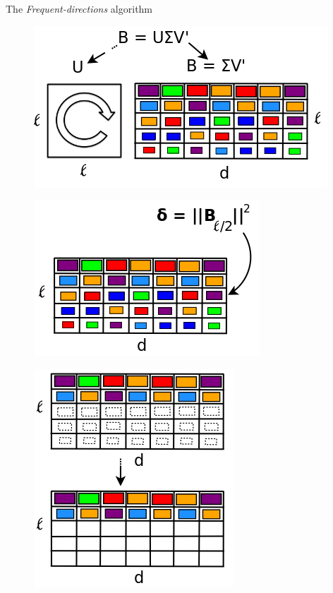 \documentclass[first=dgreen,second=purple,logo=redque]{aaltoslides}
\begin{document}
\begin{frame}[allowframebreaks=1]{The \textit{Frequent-directions} algorithm}
\framebreak

\begin{figure}
  \includegraphics[scale=0.45]{plots/fd3}
 \label{fig:fd3}
\end{figure}

\framebreak

\begin{figure}
  \includegraphics[scale=0.4]{plots/fd4}
 \label{fig:fd4}
\end{figure}

\framebreak

\begin{figure}
  \includegraphics[scale=0.375]{plots/fd5}
 \label{fig:fd5}
\end{figure}  


\end{frame}
\end{document}

